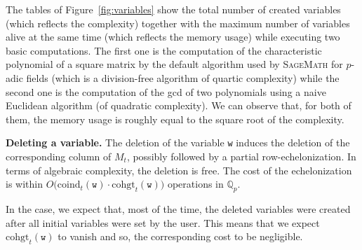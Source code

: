 \documentclass[sigconf]{acmart}
\newcommand{\Q}{\mathbb Q}
\newcommand{\Qp}{\Q_p}
\newcommand{\ttw}{\texttt{w}\xspace}
\newcommand{\sage}{\textsc{SageMath}\xspace}
\newcommand{\ZpLF}{\text{\color{output} \rm \tt ZpLF}\xspace}
\newcommand{\coind}{\text{coind}}
\newcommand{\cohgt}{\text{cohgt}}
\theoremstyle{definition}
\begin{document}
%
The tables of Figure~\ref{fig:variables} show the total number of 
created variables (which reflects the complexity) together with the 
maximum number of variables alive at the same time (which reflects 
the memory usage) while executing two basic computations.
The first one is the computation of the characteristic polynomial of a 
square matrix by the default algorithm used by \sage for $p$-adic fields 
(which is a division-free algorithm of quartic complexity) while the
second one is the computation of the gcd of two polynomials using a
naive Euclidean algorithm (of quadratic complexity). We can observe 
that, for both of them, the memory usage is roughly equal to the 
square root of the complexity.

\medskip

\noindent \textbf{Deleting a variable.}
%
The deletion of the variable \ttw induces the deletion of the 
corresponding column of $M_t$, possibly followed by a partial 
row-echelonization. In terms of algebraic complexity, the deletion is 
free. The cost of the echelonization is within
$O\big(\coind_t(\ttw) \cdot \cohgt_t(\ttw) \big)$
operations in $\Qp$.

In the \ZpLF case, we expect that, most of the time, the deleted
variables were created after all initial variables were set by the
user. This means that we expect $\cohgt_t(\ttw)$ to vanish and so,
the corresponding cost to be negligible.
\end{document}

